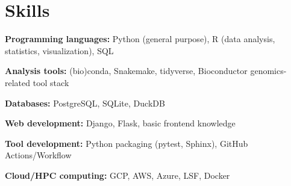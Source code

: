 \section{Skills}

\begin{entrylist}[itemsep=0.5ex]

\item \textbf{Programming languages:}
    Python (general purpose),
    R (data analysis, statistics, visualization),
    SQL

\item \textbf{Analysis tools:} (bio)conda, Snakemake, tidyverse, Bioconductor genomics-related tool stack

\item \textbf{Databases:} PostgreSQL, SQLite, DuckDB

\item \textbf{Web development:} Django, Flask, basic front\-end knowledge

\item \textbf{Tool development:} Python packaging (pytest, Sphinx), GitHub Actions/Workflow

\item \textbf{Cloud/HPC computing:} GCP, AWS, Azure, LSF, Docker

\end{entrylist}
